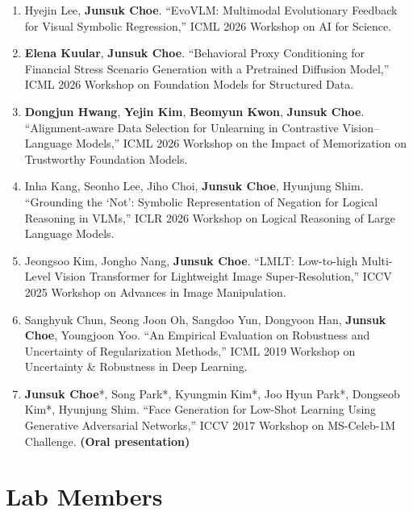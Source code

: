\documentclass[letterpaper,11pt]{article}
\begin{document}
\begin{enumerate}[itemsep=5.5pt]

    \item Hyejin Lee, \textbf{Junsuk Choe}.
    ``EvoVLM: Multimodal Evolutionary Feedback for Visual Symbolic Regression,''
    ICML 2026 Workshop on AI for Science.

    \item \textbf{Elena Kuular}, \textbf{Junsuk Choe}.
    ``Behavioral Proxy Conditioning for Financial Stress Scenario Generation with a Pretrained Diffusion Model,''
    ICML 2026 Workshop on Foundation Models for Structured Data.

    \item \textbf{Dongjun Hwang}, \textbf{Yejin Kim}, \textbf{Beomyun Kwon}, \textbf{Junsuk Choe}.
    ``Alignment-aware Data Selection for Unlearning in Contrastive Vision--Language Models,''
    ICML 2026 Workshop on the Impact of Memorization on Trustworthy Foundation Models.

    \item Inha Kang, Seonho Lee, Jiho Choi, \textbf{Junsuk Choe}, Hyunjung Shim.
    ``Grounding the `Not': Symbolic Representation of Negation for Logical Reasoning in VLMs,''
    ICLR 2026 Workshop on Logical Reasoning of Large Language Models.

    \item Jeongsoo Kim, Jongho Nang, \textbf{Junsuk Choe}.
    ``LMLT: Low-to-high Multi-Level Vision Transformer for Lightweight Image Super-Resolution,''
    ICCV 2025 Workshop on Advances in Image Manipulation.

    \item Sanghyuk Chun, Seong Joon Oh, Sangdoo Yun, Dongyoon Han, \textbf{Junsuk Choe}, Youngjoon Yoo.
    ``An Empirical Evaluation on Robustness and Uncertainty of Regularization Methods,''
    ICML 2019 Workshop on Uncertainty \& Robustness in Deep Learning.

    \item \textbf{Junsuk Choe}*, Song Park*, Kyungmin Kim*, Joo Hyun Park*, Dongseob Kim*, Hyunjung Shim.
    ``Face Generation for Low-Shot Learning Using Generative Adversarial Networks,''
    ICCV 2017 Workshop on MS-Celeb-1M Challenge. \textbf{(Oral presentation)}

\end{enumerate}

\section{Lab Members}
\end{document}
